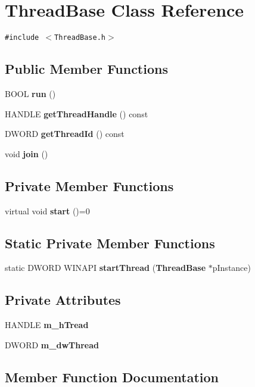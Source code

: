\section{Thread\-Base Class Reference}
\label{class_thread_base}
{\tt \#include $<$Thread\-Base.h$>$}

\subsection*{Public Member Functions}
\begin{CompactItemize}
\item 
BOOL {\bf run} ()
\item 
HANDLE {\bf get\-Thread\-Handle} () const
\item 
DWORD {\bf get\-Thread\-Id} () const
\item 
void {\bf join} ()
\end{CompactItemize}
\subsection*{Private Member Functions}
\begin{CompactItemize}
\item 
virtual void {\bf start} ()=0
\end{CompactItemize}
\subsection*{Static Private Member Functions}
\begin{CompactItemize}
\item 
static DWORD WINAPI {\bf start\-Thread} ({\bf Thread\-Base} $\ast$p\-Instance)
\end{CompactItemize}
\subsection*{Private Attributes}
\begin{CompactItemize}
\item 
HANDLE {\bf m\_\-h\-Tread}
\item 
DWORD {\bf m\_\-dw\-Thread}
\end{CompactItemize}


\subsection{Member Function Documentation}
